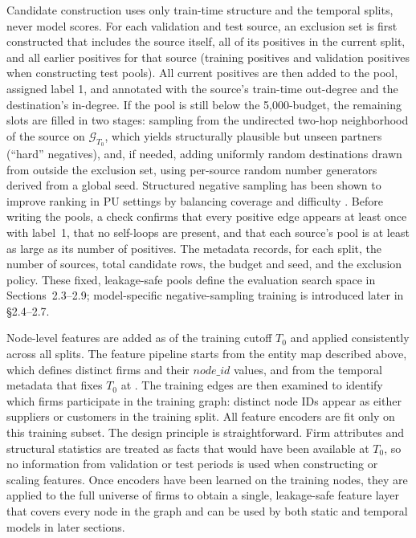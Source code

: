 Candidate construction uses only train-time structure and the temporal splits, never model scores. For each validation and test source, an exclusion set is first constructed that includes the source itself, all of its positives in the current split, and all earlier positives for that source (training positives and validation positives when constructing test pools). All current positives are then added to the pool, assigned label 1, and annotated with the source's train-time out-degree and the destination's in-degree. If the pool is still below the 5{,}000-budget, the remaining slots are filled in two stages: sampling from the undirected two-hop neighborhood of the source on \(\mathcal{G}_{T_0}\), which yields structurally plausible but unseen partners (``hard'' negatives), and, if needed, adding uniformly random destinations drawn from outside the exclusion set, using per-source random number generators derived from a global seed. Structured negative sampling has been shown to improve ranking in PU settings by balancing coverage and difficulty \parencite{wang_denoising_2021,robinson_contrastive_2021}. Before writing the pools, a check confirms that every positive edge appears at least once with label~1, that no self-loops are present, and that each source's pool is at least as large as its number of positives. The metadata records, for each split, the number of sources, total candidate rows, the budget and seed, and the exclusion policy. These fixed, leakage-safe pools define the evaluation search space in Sections~2.3--2.9; model-specific negative-sampling training is introduced later in \S2.4--2.7.

Node-level features are added as of the training cutoff \(T_0\) and applied consistently across all splits. The feature pipeline starts from the entity map described above, which defines \NumFirms distinct firms and their \(\mathit{node\_id}\) values, and from the temporal metadata that fixes \(T_0\) at \TrainCutoffDate. The training edges are then examined to identify which firms participate in the training graph: \TrainNodes distinct node IDs appear as either suppliers or customers in the training split. All feature encoders are fit only on this training subset. The design principle is straightforward. Firm attributes and structural statistics are treated as facts that would have been available at \(T_0\), so no information from validation or test periods is used when constructing or scaling features. Once encoders have been learned on the training nodes, they are applied to the full universe of \NumFirms firms to obtain a single, leakage-safe feature layer that covers every node in the graph and can be used by both static and temporal models in later sections.

